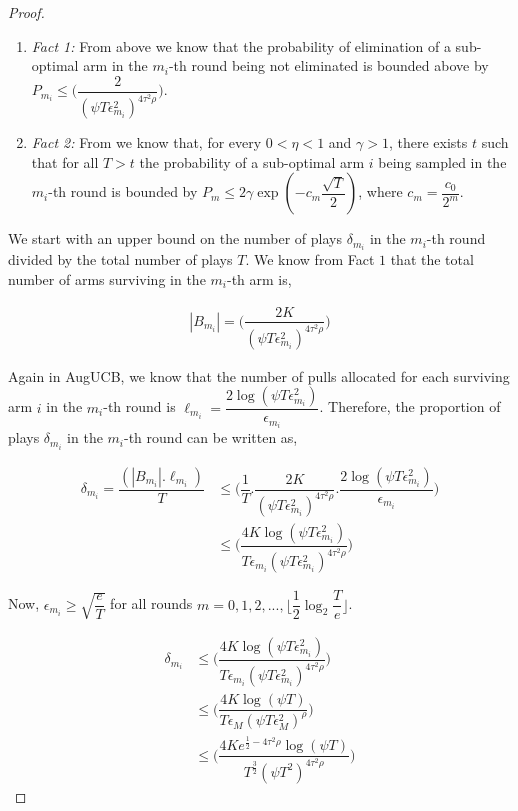 \begin{proof}
\begin{enumerate}
\item \emph{Fact 1:} From above we know that the probability of elimination of a sub-optimal arm in the $m_{i}$-th round being not eliminated is bounded above by $P_{m_{i}}\leq\bigg(\dfrac{2}{(\psi T\epsilon_{m_{i}}^{2})^{4\tau^{2}\rho}}\bigg)$.
\item \emph{Fact 2:} From \cite{tolpin2012mcts} we know that, for every $0<\eta <1$ and $\gamma > 1$, there exists $t$ such that for all $T>t$ the probability of a sub-optimal arm $i$ being sampled in the $m_{i}$-th round is bounded by $P_{m}\leq 2\gamma \exp(-c_{m}\dfrac{\sqrt{T}}{2})$, where $c_{m}=\dfrac{c_{0}}{2^{m}}$.
\end{enumerate}

We start with an upper bound on the number of plays $\delta_{m_{i}}$ in the $m_{i}$-th round divided by the total number of plays $T$. We know  from Fact $1$  that the total number of arms surviving in the $m_{i}$-th arm is, 

\begin{align*}
|B_{m_{i}}|=\bigg(\dfrac{2K}{(\psi T\epsilon_{m_{i}}^{2})^{4\tau^{2}\rho}}\bigg) 
\end{align*}     

Again in AugUCB, we know that the number of pulls allocated for each surviving arm $i$ in the $m_{i}$-th round is $\ell_{m_{i}}=\dfrac{2\log (\psi T \epsilon_{m_{i}}^{2})}{\epsilon_{m_{i}}}$. Therefore, the proportion of plays $\delta_{m_{i}}$ in the $m_{i}$-th round can be written as,

\begin{align*}
\delta_{m_{i}}=\dfrac{(|B_{m_{i}}|.\ell_{m_{i}})}{T} &\leq \bigg(\dfrac{1}{T}.\dfrac{2K}{(\psi T\epsilon_{m_{i}}^{2})^{4\tau^{2}\rho}}.\dfrac{2\log (\psi T \epsilon_{m_{i}}^{2})}{\epsilon_{m_{i}}}\bigg)\\
& \leq \bigg(\dfrac{4K\log (\psi T \epsilon_{m_{i}}^{2})}{T\epsilon_{m_{i}}(\psi T\epsilon_{m_{i}}^{2})^{4\tau^{2}\rho}}\bigg)
\end{align*}

Now, $\epsilon_{m_{i}}\geq \sqrt{\dfrac{e}{T}}$ for all rounds $m=0,1,2,...,\big \lfloor \dfrac{1}{2}\log_{2} \dfrac{T}{e}\big\rfloor$.

\begin{align*}
\delta_{m_{i}} &\leq \bigg(\dfrac{4K\log (\psi T \epsilon_{m_{i}}^{2})}{T\epsilon_{m_{i}}(\psi T\epsilon_{m_{i}}^{2})^{4\tau^{2}\rho}}\bigg)\\
& \leq \bigg(\dfrac{4K\log (\psi T )}{T\epsilon_{M}(\psi T\epsilon_{M}^{2})^{\rho}}\bigg)\\
& \leq \bigg(\dfrac{4Ke^{\frac{1}{2}-4\tau^{2}\rho}\log (\psi T )}{T^{\frac{3}{2}}(\psi T^2)^{4\tau^{2}\rho}}\bigg) 
\end{align*}


\end{proof}
